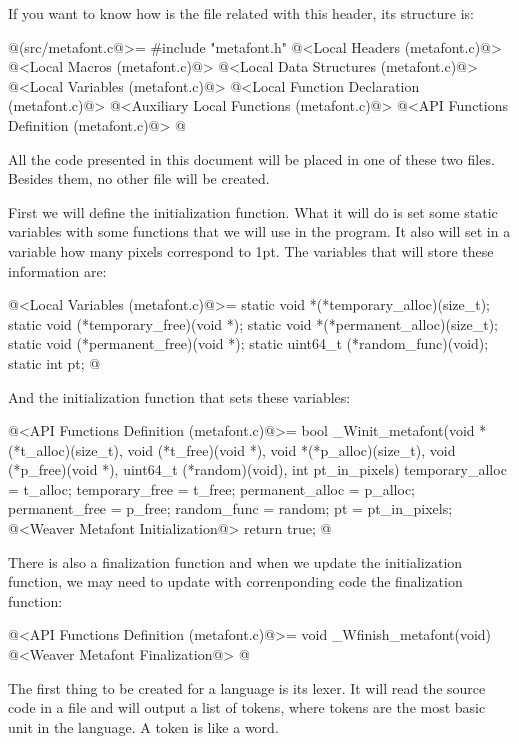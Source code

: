 If you want to know how is the  file related
with this header, its structure is:

\iniciocodigo
@(src/metafont.c@>=
#include "metafont.h"
@<Local Headers (metafont.c)@>
@<Local Macros (metafont.c)@>
@<Local Data Structures (metafont.c)@>
@<Local Variables (metafont.c)@>
@<Local Function Declaration (metafont.c)@>
@<Auxiliary Local Functions (metafont.c)@>
@<API Functions Definition (metafont.c)@>
@
\fimcodigo

All the code presented in this document will be placed in one of these
two files. Besides them, no other file will be created.


First we will define the initialization function. What it will do is
set some static variables with some functions that we will use in the
program. It also will set in a variable how many pixels correspond to
1pt. The variables that will store these information are:

\iniciocodigo
@<Local Variables (metafont.c)@>=
static void *(*temporary_alloc)(size_t);
static void (*temporary_free)(void *);
static void *(*permanent_alloc)(size_t);
static void (*permanent_free)(void *);
static uint64_t (*random_func)(void);
static int pt;
@
\fimcodigo

And the initialization function that sets these variables:

\iniciocodigo
@<API Functions Definition (metafont.c)@>=
bool _Winit_metafont(void *(*t_alloc)(size_t),
                    void (*t_free)(void *),
                    void *(*p_alloc)(size_t),
                    void (*p_free)(void *),
                    uint64_t (*random)(void), int pt_in_pixels){
  temporary_alloc = t_alloc;
  temporary_free = t_free;
  permanent_alloc = p_alloc;
  permanent_free = p_free;
  random_func = random;
  pt = pt_in_pixels;
  @<Weaver Metafont Initialization@>
  return true;
}
@
\fimcodigo

There is also a finalization function and when we update the
initialization function, we may need to update with correnponding code
the finalization function:

\iniciocodigo
@<API Functions Definition (metafont.c)@>=
void _Wfinish_metafont(void){
  @<Weaver Metafont Finalization@>
}
@
\fimcodigo



The first thing to be created for a language is its lexer. It will
read the source code in a file and will output a list of tokens, where
tokens are the most basic unit in the language. A token is like a
word.

